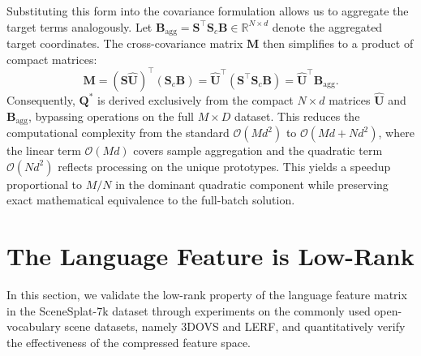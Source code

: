 Substituting this form into the covariance formulation allows us to aggregate the target terms analogously. Let $\mathbf{B}_{\text{agg}} = \mathbf{S}^\top \mathbf{S}_c \mathbf{B} \in \mathbb{R}^{N \times d}$ denote the aggregated target coordinates. The cross-covariance matrix $\mathbf{M}$ then simplifies to a product of compact matrices:
\begin{equation}
    \mathbf{M} = (\mathbf{S} \hat{\mathbf{U}})^\top (\mathbf{S}_c \mathbf{B}) = \hat{\mathbf{U}}^\top (\mathbf{S}^\top \mathbf{S}_c \mathbf{B}) = \hat{\mathbf{U}}^\top \mathbf{B}_{\text{agg}}.
    \label{eq:final_M}
\end{equation}
Consequently, $\mathbf{Q}^*$ is derived exclusively from the compact $N \times d$ matrices $\hat{\mathbf{U}}$ and $\mathbf{B}_{\text{agg}}$, bypassing operations on the full $M \times D$ dataset. This reduces the computational complexity from the standard $\mathcal{O}(M d^2)$ to $\mathcal{O}(M d + N d^2)$, where the linear term $\mathcal{O}(M d)$ covers sample aggregation and the quadratic term $\mathcal{O}(N d^2)$ reflects processing on the unique prototypes. This yields a speedup proportional to $M/N$ in the dominant quadratic component while preserving exact mathematical equivalence to the full-batch solution.

\section{The Language Feature is Low-Rank}
\label{sec:analysis}


In this section, we validate the low-rank property of the language feature matrix in the SceneSplat-7k \cite{li2025scenesplat} dataset through experiments on the commonly used open-vocabulary scene datasets, namely 3DOVS \cite{liu2023weakly} and LERF\cite{lerf2023}, and quantitatively verify the effectiveness of the compressed feature space.

